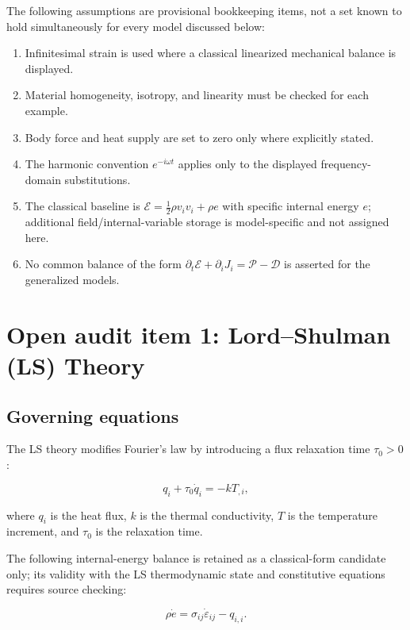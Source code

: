 The following assumptions are provisional bookkeeping items, not a set known to hold simultaneously for every model discussed below:
\begin{enumerate}
\item Infinitesimal strain is used where a classical linearized mechanical balance is displayed.
\item Material homogeneity, isotropy, and linearity must be checked for each example.
\item Body force and heat supply are set to zero only where explicitly stated.
\item The harmonic convention $e^{-i\omega t}$ applies only to the displayed frequency-domain substitutions.
\item The classical baseline is $\mathcal{E}=\frac12\rho v_i v_i+\rho e$ with specific internal energy $e$; additional field/internal-variable storage is model-specific and not assigned here.
\item No common balance of the form $\partial_t\mathcal{E}+\partial_iJ_i=\mathcal{P}-\mathcal{D}$ is asserted for the generalized models.
\end{enumerate}

\section{Open audit item 1: Lord--Shulman (LS) Theory}

\subsection{Governing equations}

The LS theory modifies Fourier's law by introducing a flux relaxation time $\tau_0 > 0$:

\begin{equation}
q_i + \tau_0 \dot{q}_i = -k T_{,i},
\label{ef:ls:1}
\end{equation}

where $q_i$ is the heat flux, $k$ is the thermal conductivity, $T$ is the temperature increment, and $\tau_0$ is the relaxation time.

The following internal-energy balance is retained as a classical-form candidate only; its validity with the LS thermodynamic state and constitutive equations requires source checking:

\begin{equation}
\rho \dot{e} = \sigma_{ij}\dot{\varepsilon}_{ij} - q_{i,i}.
\label{ef:ls:2}
\end{equation}

